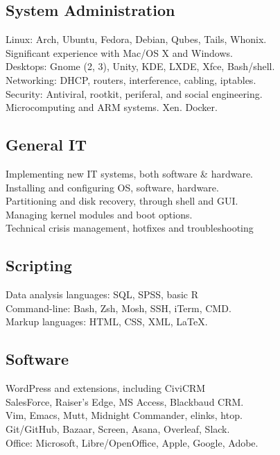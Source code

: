 \documentclass[]{deedy-resume-openfont}
\begin{document}
\begin{minipage}[t]{.5\textwidth}
    \subsection{System Administration}
		\textbullet{} Linux: Arch, Ubuntu, Fedora, Debian, Qubes, Tails, Whonix.\\
        \textbullet{} Significant experience with Mac/OS X and Windows. \\
   		\textbullet{} Desktops: Gnome (2, 3), Unity, KDE, LXDE, Xfce, Bash/shell. \\
    	\textbullet{} Networking: DHCP, routers, interference, cabling, iptables.\\
		\textbullet{} Security: Antiviral, rootkit, periferal, and social engineering.\\
        \textbullet{} Microcomputing and ARM systems. Xen. Docker.
    \sectionsep
	\subsection{General IT}
   		\textbullet{} Implementing new IT systems, both software \& hardware.\\
       	\textbullet{} Installing and configuring OS, software, hardware. \\
        \textbullet{} Partitioning and disk recovery, through shell and GUI. \\
        \textbullet{} Managing kernel modules and boot options.\\
		\textbullet{} Technical crisis management, hotfixes and troubleshooting
    \sectionsep
   	\subsection{Scripting}
        \textbullet{} Data analysis languages: SQL, SPSS, basic R \\
        \textbullet{} Command-line: Bash, Zsh, Mosh, SSH, iTerm, CMD.\\
        \textbullet{} Markup languages: HTML, CSS, XML, LaTeX. 
    \sectionsep
    \subsection{Software}
    	\textbullet{} WordPress and extensions, including CiviCRM \\
        \textbullet{} SalesForce, Raiser's Edge, MS Access, Blackbaud CRM.\\
        \textbullet{} Vim, Emacs, Mutt, Midnight Commander, elinks, htop.\\
        \textbullet{} Git/GitHub, Bazaar, Screen, Asana, Overleaf, Slack. \\
        \textbullet{} Office: Microsoft, Libre/OpenOffice, Apple, Google, Adobe.
\end{minipage}
\end{document}
